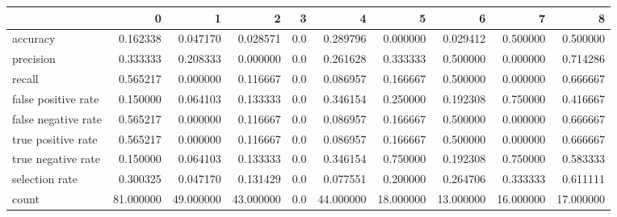 \begin{tabular}{lrrrrrrrrr}
\toprule
{} &          0 &          1 &          2 &    3 &          4 &          5 &          6 &          7 &          8 \\
\midrule
accuracy            &   0.162338 &   0.047170 &   0.028571 &  0.0 &   0.289796 &   0.000000 &   0.029412 &   0.500000 &   0.500000 \\
precision           &   0.333333 &   0.208333 &   0.000000 &  0.0 &   0.261628 &   0.333333 &   0.500000 &   0.000000 &   0.714286 \\
recall              &   0.565217 &   0.000000 &   0.116667 &  0.0 &   0.086957 &   0.166667 &   0.500000 &   0.000000 &   0.666667 \\
false positive rate &   0.150000 &   0.064103 &   0.133333 &  0.0 &   0.346154 &   0.250000 &   0.192308 &   0.750000 &   0.416667 \\
false negative rate &   0.565217 &   0.000000 &   0.116667 &  0.0 &   0.086957 &   0.166667 &   0.500000 &   0.000000 &   0.666667 \\
true positive rate  &   0.565217 &   0.000000 &   0.116667 &  0.0 &   0.086957 &   0.166667 &   0.500000 &   0.000000 &   0.666667 \\
true negative rate  &   0.150000 &   0.064103 &   0.133333 &  0.0 &   0.346154 &   0.750000 &   0.192308 &   0.750000 &   0.583333 \\
selection rate      &   0.300325 &   0.047170 &   0.131429 &  0.0 &   0.077551 &   0.200000 &   0.264706 &   0.333333 &   0.611111 \\
count               &  81.000000 &  49.000000 &  43.000000 &  0.0 &  44.000000 &  18.000000 &  13.000000 &  16.000000 &  17.000000 \\
\bottomrule
\end{tabular}
